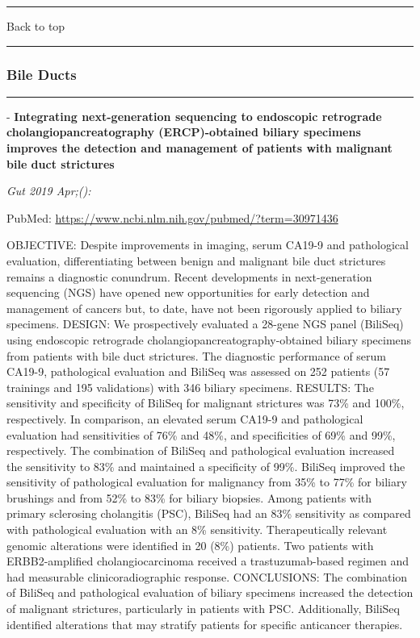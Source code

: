 \documentclass[]{article}
\begin{document}
\begin{center}\rule{0.5\linewidth}{\linethickness}\end{center}

Back to top

\begin{center}\rule{0.5\linewidth}{\linethickness}\end{center}

\pagebreak

\hypertarget{bile-ducts-2}{%
\subsubsection{Bile Ducts}\label{bile-ducts-2}}

\begin{center}\rule{0.5\linewidth}{\linethickness}\end{center}

 - \textbf{Integrating next-generation sequencing to endoscopic
retrograde cholangiopancreatography (ERCP)-obtained biliary specimens
improves the detection and management of patients with malignant bile
duct strictures}

\emph{Gut 2019 Apr;():}

PubMed: \url{https://www.ncbi.nlm.nih.gov/pubmed/?term=30971436}

OBJECTIVE: Despite improvements in imaging, serum CA19-9 and
pathological evaluation, differentiating between benign and malignant
bile duct strictures remains a diagnostic conundrum. Recent developments
in next-generation sequencing (NGS) have opened new opportunities for
early detection and management of cancers but, to date, have not been
rigorously applied to biliary specimens. DESIGN: We prospectively
evaluated a 28-gene NGS panel (BiliSeq) using endoscopic retrograde
cholangiopancreatography-obtained biliary specimens from patients with
bile duct strictures. The diagnostic performance of serum CA19-9,
pathological evaluation and BiliSeq was assessed on 252 patients (57
trainings and 195 validations) with 346 biliary specimens. RESULTS: The
sensitivity and specificity of BiliSeq for malignant strictures was 73\%
and 100\%, respectively. In comparison, an elevated serum CA19-9 and
pathological evaluation had sensitivities of 76\% and 48\%, and
specificities of 69\% and 99\%, respectively. The combination of BiliSeq
and pathological evaluation increased the sensitivity to 83\% and
maintained a specificity of 99\%. BiliSeq improved the sensitivity of
pathological evaluation for malignancy from 35\% to 77\% for biliary
brushings and from 52\% to 83\% for biliary biopsies. Among patients
with primary sclerosing cholangitis (PSC), BiliSeq had an 83\%
sensitivity as compared with pathological evaluation with an 8\%
sensitivity. Therapeutically relevant genomic alterations were
identified in 20 (8\%) patients. Two patients with ERBB2-amplified
cholangiocarcinoma received a trastuzumab-based regimen and had
measurable clinicoradiographic response. CONCLUSIONS: The combination of
BiliSeq and pathological evaluation of biliary specimens increased the
detection of malignant strictures, particularly in patients with PSC.
Additionally, BiliSeq identified alterations that may stratify patients
for specific anticancer therapies.
\end{document}
